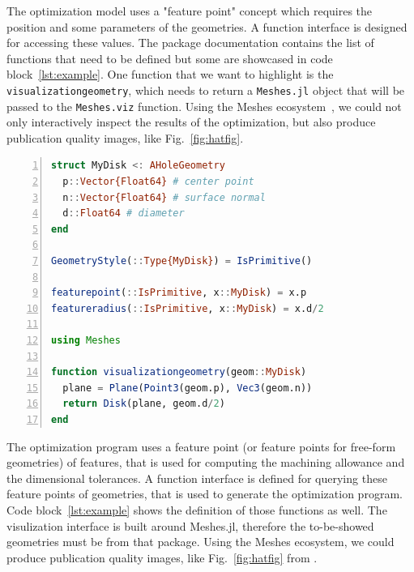 \documentclass{juliacon}
\begin{document}
The optimization model uses a "feature point" concept which requires the position and some parameters of the geometries.
A function interface is designed for accessing these values.
The package documentation contains the list of functions that need to be defined but some are showcased in code block~\ref{lst:example}.
One function that we want to highlight is the \texttt{visualizationgeometry}, which needs to return a \texttt{Meshes.jl} object that will be passed to the \texttt{Meshes.viz} function.
Using the Meshes ecosystem~\cite{Hoffimann2023}, we could not only interactively inspect the results of the optimization, but also produce publication quality images, like Fig.~\ref{fig:hatfig}.

\vspace*{1em}

\begin{lstlisting}[language = Julia, numbers=left, label={lst:example}, caption={Defining a new type for the optimization model.}]
struct MyDisk <: AHoleGeometry
  p::Vector{Float64} # center point
  n::Vector{Float64} # surface normal
  d::Float64 # diameter
end

GeometryStyle(::Type{MyDisk}) = IsPrimitive()

featurepoint(::IsPrimitive, x::MyDisk) = x.p
featureradius(::IsPrimitive, x::MyDisk) = x.d/2

using Meshes

function visualizationgeometry(geom::MyDisk)
  plane = Plane(Point3(geom.p), Vec3(geom.n))
  return Disk(plane, geom.d/2)
end
\end{lstlisting}


\iffalse
The optimization program uses a feature point (or feature points for free-form geometries) of features, that is used for computing the machining allowance and the dimensional tolerances.
A function interface is defined for querying these feature points of geometries, that is used to generate the optimization program.
Code block~\ref{lst:example} shows the definition of those functions as well.
The visulization interface is built around Meshes.jl, therefore the to-be-showed geometries must be from that package.
Using the Meshes ecosystem, we could produce publication quality images, like Fig.~\ref{fig:hatfig} from \cite{cserteg:2023_Annals}.
\end{document}
